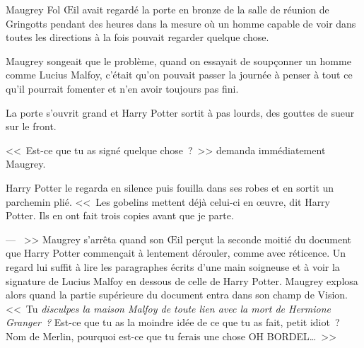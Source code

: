 \later

Maugrey Fol Œil avait regardé la porte en bronze de la salle de réunion de Gringotts pendant des heures dans la mesure où un homme capable de voir dans toutes les directions à la fois pouvait regarder quelque chose.

Maugrey songeait que le problème, quand on essayait de soupçonner un homme comme Lucius Malfoy, c'était qu'on pouvait passer la journée à penser à tout ce qu'il pourrait fomenter et n'en avoir toujours pas fini.

La porte s'ouvrit grand et Harry Potter sortit à pas lourds, des gouttes de sueur sur le front.

<<~Est-ce que tu as signé quelque chose~?~>> demanda immédiatement Maugrey.

Harry Potter le regarda en silence puis fouilla dans ses robes et en sortit un parchemin plié. <<~Les gobelins mettent déjà celui-ci en œuvre, dit Harry Potter. Ils en ont fait trois copies avant que je parte.

--- ~>> Maugrey s'arrêta quand son Œil perçut la seconde moitié du document que Harry Potter commençait à lentement dérouler, comme avec réticence. Un regard lui suffit à lire les paragraphes écrits d'une main soigneuse et à voir la signature de Lucius Malfoy en dessous de celle de Harry Potter. Maugrey explosa alors quand la partie supérieure du document entra dans son champ de Vision. <<~Tu \emph{disculpes la maison Malfoy de toute lien avec la mort de Hermione Granger~?} Est-ce que tu as la moindre idée de ce que tu as fait, petit idiot~? Nom de Merlin, pourquoi est-ce que tu ferais une chose OH BORDEL…~>> 

